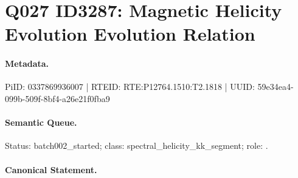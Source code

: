 \section*{Q027 ID3287: Magnetic Helicity Evolution Evolution Relation}
\paragraph{Metadata.}
PiID: 0337869936007 | RTEID: RTE:P12764.1510:T2.1818 | UUID: 59e34ea4-099b-509f-8bf4-a26e21f0fba9

\paragraph{Semantic Queue.}
Status: batch002\_started; class: spectral\_helicity\_kk\_segment; role: .

\paragraph{Canonical Statement.}
